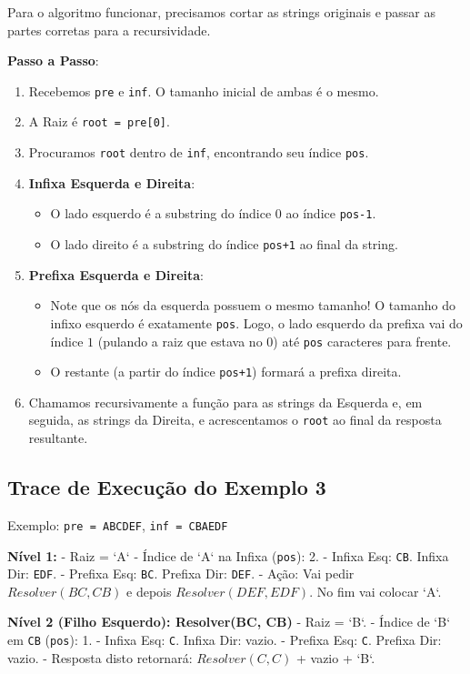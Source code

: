 \documentclass[11pt,a4paper]{article}
\begin{document}
Para o algoritmo funcionar, precisamos cortar as strings originais e passar as partes corretas para a recursividade.

\textbf{Passo a Passo}:
\begin{enumerate}
    \item Recebemos \texttt{pre} e \texttt{inf}. O tamanho inicial de ambas é o mesmo.
    \item A Raiz é \texttt{root = pre[0]}.
    \item Procuramos \texttt{root} dentro de \texttt{inf}, encontrando seu índice \texttt{pos}.
    \item \textbf{Infixa Esquerda e Direita}:
    \begin{itemize}
        \item O lado esquerdo é a substring do índice $0$ ao índice \texttt{pos-1}.
        \item O lado direito é a substring do índice \texttt{pos+1} ao final da string.
    \end{itemize}
    \item \textbf{Prefixa Esquerda e Direita}:
    \begin{itemize}
        \item Note que os nós da esquerda possuem o mesmo tamanho! O tamanho do infixo esquerdo é exatamente \texttt{pos}. Logo, o lado esquerdo da prefixa vai do índice $1$ (pulando a raiz que estava no $0$) até \texttt{pos} caracteres para frente.
        \item O restante (a partir do índice \texttt{pos+1}) formará a prefixa direita.
    \end{itemize}
    \item Chamamos recursivamente a função para as strings da Esquerda e, em seguida, as strings da Direita, e acrescentamos o \texttt{root} ao final da resposta resultante.
\end{enumerate}

\subsection{Trace de Execução do Exemplo 3}
Exemplo: \texttt{pre = ABCDEF}, \texttt{inf = CBAEDF}

\textbf{Nível 1:}
- Raiz = `A`
- Índice de `A` na Infixa (\texttt{pos}): 2.
- Infixa Esq: \texttt{CB}. Infixa Dir: \texttt{EDF}.
- Prefixa Esq: \texttt{BC}. Prefixa Dir: \texttt{DEF}.
- Ação: Vai pedir $Resolver(BC, CB)$ e depois $Resolver(DEF, EDF)$. No fim vai colocar `A`.

\textbf{Nível 2 (Filho Esquerdo): Resolver(BC, CB)}
- Raiz = `B`.
- Índice de `B` em \texttt{CB} (\texttt{pos}): 1.
- Infixa Esq: \texttt{C}. Infixa Dir: vazio.
- Prefixa Esq: \texttt{C}. Prefixa Dir: vazio.
- Resposta disto retornará: $Resolver(C, C)$ + vazio + `B`.
\end{document}
